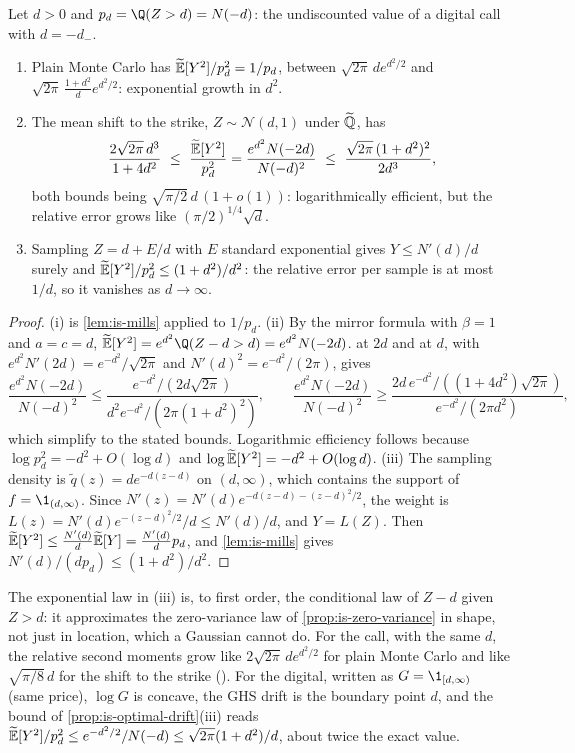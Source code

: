 \begin{proposition}\label{prop:is-rare}
Let $d>0$ and $p_d=\Q(Z>d)=N(-d)$: the undiscounted value of a digital call with
$d=-d_-$.
\begin{enumerate}[label=(\roman*)]
  \item Plain Monte Carlo has $\widetilde{\mathbb E}[Y^2]/p_d^2=1/p_d$, between $\sqrt{2\pi}\,de^{d^2/2}$ and
    $\sqrt{2\pi}\,\frac{1+d^2}{d}e^{d^2/2}$: exponential growth in $d^2$.
  \item The mean shift to the strike, $Z\sim\mathcal N(d,1)$ under $\widetilde{\mathbb Q}$, has
    \[
      \frac{2\sqrt{2\pi}\,d^3}{1+4d^2}\ \le\ \frac{\Et[Y^2]}{p_d^2}=\frac{e^{d^2}N(-2d)}{N(-d)^2}\ \le\ \frac{\sqrt{2\pi}\,(1+d^2)^2}{2d^3},
    \]
    both bounds being $\sqrt{\pi/2}\,d\,(1+o(1))$: logarithmically efficient, but the relative
    error grows like $(\pi/2)^{1/4}\sqrt d$.
  \item Sampling $Z=d+E/d$ with $E$ standard exponential gives $Y\le N'(d)/d$ surely and
    $\widetilde{\mathbb E}[Y^2]/p_d^2\le(1+d^2)/d^2$: the relative error per sample is at most $1/d$, so it
    vanishes as $d\to\infty$.
\end{enumerate}
\end{proposition}

\begin{proof}
(i) is \cref{lem:is-mills} applied to $1/p_d$. (ii) By the mirror formula with $\beta=1$ and
$a=c=d$, $\Et[Y^2]=e^{d^2}\Q(Z-d>d)=e^{d^2}N(-2d)$.  at $2d$ and at $d$,
with $e^{d^2}N'(2d)=e^{-d^2}/\sqrt{2\pi}$ and $N'(d)^2=e^{-d^2}/(2\pi)$, gives
\[
  \frac{e^{d^2}N(-2d)}{N(-d)^2}\le\frac{e^{-d^2}/(2d\sqrt{2\pi})}{d^2e^{-d^2}/(2\pi(1+d^2)^2)},\qquad
  \frac{e^{d^2}N(-2d)}{N(-d)^2}\ge\frac{2d\,e^{-d^2}/((1+4d^2)\sqrt{2\pi})}{e^{-d^2}/(2\pi d^2)},
\]
which simplify to the stated bounds. Logarithmic efficiency follows because
$\log p_d^2=-d^2+O(\log d)$ and $\log\widetilde{\mathbb E}[Y^2]=-d^2+O(\log d)$.
(iii) The sampling density is $\tilde q(z)=de^{-d(z-d)}$ on $(d,\infty)$, which contains the
support of $f=\1_{(d,\infty)}$. Since $N'(z)=N'(d)e^{-d(z-d)-(z-d)^2/2}$, the weight is
$L(z)=N'(d)e^{-(z-d)^2/2}/d\le N'(d)/d$, and $Y=L(Z)$. Then
$\widetilde{\mathbb E}[Y^2]\le\frac{N'(d)}d\widetilde{\mathbb E}[Y]=\frac{N'(d)}dp_d$, and \cref{lem:is-mills} gives
$N'(d)/(dp_d)\le(1+d^2)/d^2$.
\end{proof}

The exponential law in (iii) is, to first order, the conditional law of $Z-d$ given $Z>d$:
it approximates the zero-variance law of \cref{prop:is-zero-variance} in shape, not just in
location, which a Gaussian cannot do. For the call, with the same $d$, the relative second
moments grow like $2\sqrt{2\pi}\,de^{d^2/2}$ for plain Monte Carlo and like $\sqrt{\pi/8}\,d$
for the shift to the strike (). For the digital, written as $G=\1_{[d,\infty)}$ (same price), $\log G$ is concave, the GHS drift
is the boundary point $d$, and the bound of \cref{prop:is-optimal-drift}(iii) reads
$\widetilde{\mathbb E}[Y^2]/p_d^2\le e^{-d^2/2}/N(-d)\le\sqrt{2\pi}(1+d^2)/d$, about twice the exact value.

